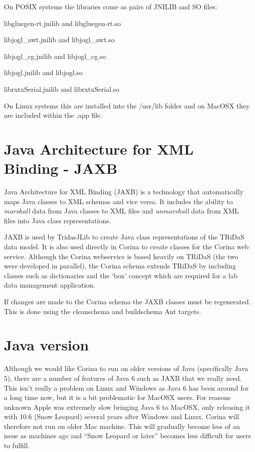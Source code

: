 On POSIX systems the libraries come as pairs of JNILIB and SO files:

\begin{itemize*}
 \item libgluegen-rt.jnilib and libgluegen-rt.so
 \item libjogl\_awt.jnilib and libjogl\_awt.so
 \item libjogl\_cg.jnilib and libjogl\_cg.so
 \item libjogl.jnilib and libjogl.so
 \item librxtxSerial.jnilib and librxtxSerial.so
\end{itemize*}

On Linux systems this are installed into the /usr/lib folder and on MacOSX they are included within the .app file.

\section{Java Architecture for XML Binding - JAXB}
\label{txt:jaxb}

Java Architecture for XML Binding (JAXB) is a technology that automatically maps Java classes to XML schemas and vice versa.  It includes the ability to \emph{marshall} data from Java classes to XML files and \emph{unmarshall} data from XML files into Java class representations.  

JAXB is used by TridasJLib to create Java class representations of the TRiDaS data model.  It is also used directly in Corina to create classes for the Corina web service.  Although the Corina webservice is based heavily on TRiDaS (the two were developed in parallel), the Corina schema extends TRiDaS by including classes such as dictionaries and the `box' concept which are required for a lab data management application.  

If changes are made to the Corina schema the JAXB classes must be regenerated.  This is done using the cleanschema and buildschema Ant targets.



\section{Java version}
\label{txt:java}
Although we would like Corina to run on older versions of Java (specifically Java 5), there are a number of features of Java 6 such as JAXB that we really need.  This isn't really a problem on Linux and Windows as Java 6 has been around for a long time now, but it is a bit problematic for MacOSX users.  For reasons unknown Apple was extremely slow bringing Java 6 to MacOSX, only releasing it with 10.6 (Snow Leopard) several years after Windows and Linux.  Corina will therefore not run on older Mac machine.  This will gradually become less of an issue as machines age and ``Snow Leopard or later'' becomes less difficult for users to fulfill.  

